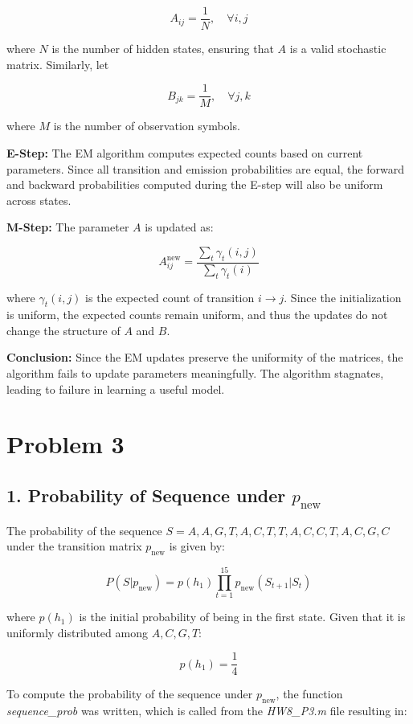 \documentclass{article}
\begin{document}
\[
A_{ij} = \frac{1}{N}, \quad \forall i, j
\]

where \( N \) is the number of hidden states, ensuring that \( A \) is a valid stochastic matrix. Similarly, let

\[
B_{jk} = \frac{1}{M}, \quad \forall j, k
\]

where \( M \) is the number of observation symbols.

\textbf{E-Step:} The EM algorithm computes expected counts based on current parameters. Since all transition and emission probabilities are equal, the forward and backward probabilities computed during the E-step will also be uniform across states.

\textbf{M-Step:} The parameter $A$ is updated as:

\[
A_{ij}^{\text{new}} = \frac{\sum_t \gamma_t(i, j)}{\sum_t \gamma_t(i)}
\]

where \( \gamma_t(i, j) \) is the expected count of transition \( i \to j \). Since the initialization is uniform, the expected counts remain uniform, and thus the updates do not change the structure of \( A \) and \( B \).

\textbf{Conclusion:} Since the EM updates preserve the uniformity of the matrices, the algorithm fails to update parameters meaningfully.
The algorithm stagnates,
leading to failure in learning a useful model.





\section*{Problem 3}


\subsection*{1. Probability of Sequence under \( p_{\text{new}} \)}

The probability of the sequence \( S = A, A, G, T, A, C, T, T, A, C, C, T, A, C, G, C \) under the transition matrix \( p_{\text{new}} \) is given by:

\[
P(S | p_{\text{new}}) = p(h_1) \prod_{t=1}^{15} p_{\text{new}}(S_{t+1} | S_t)
\]

where \( p(h_1) \) is the initial probability of being in the first state. Given that it is uniformly distributed among \( A, C, G, T \):

\[
p(h_1) = \frac{1}{4}
\]

To compute the probability of the sequence under \( p_{\text{new}} \), the function \textit{sequence\_prob} was written, which is called from the \textit{HW8\_P3.m} file resulting in:
\end{document}
